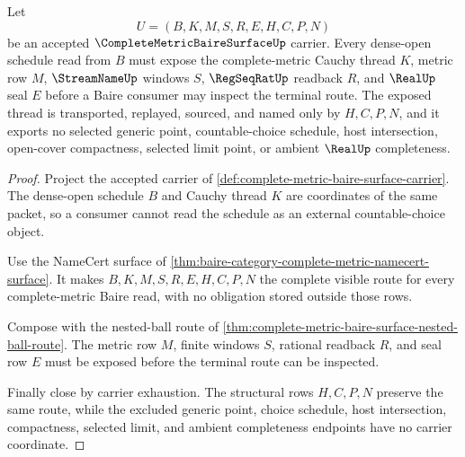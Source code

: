 \begin{theorem}
\label{thm:complete-metric-baire-surface-open-density-thread}
Let
$$
U=(B,K,M,S,R,E,H,C,P,N)
$$
be an accepted $\CompleteMetricBaireSurfaceUp$ carrier. Every dense-open schedule read from $B$ must expose the complete-metric Cauchy thread $K$, metric row $M$, $\StreamNameUp$ windows $S$, $\RegSeqRatUp$ readback $R$, and $\RealUp$ seal $E$ before a Baire consumer may inspect the terminal route. The exposed thread is transported, replayed, sourced, and named only by $H,C,P,N$, and it exports no selected generic point, countable-choice schedule, host intersection, open-cover compactness, selected limit point, or ambient $\RealUp$ completeness.
\end{theorem}
\begin{proof}
Project the accepted carrier of \autoref{def:complete-metric-baire-surface-carrier}. The dense-open schedule $B$ and Cauchy thread $K$ are coordinates of the same packet, so a consumer cannot read the schedule as an external countable-choice object.

Use the NameCert surface of \autoref{thm:baire-category-complete-metric-namecert-surface}. It makes $B,K,M,S,R,E,H,C,P,N$ the complete visible route for every complete-metric Baire read, with no obligation stored outside those rows.

Compose with the nested-ball route of \autoref{thm:complete-metric-baire-surface-nested-ball-route}. The metric row $M$, finite windows $S$, rational readback $R$, and seal row $E$ must be exposed before the terminal route can be inspected.

Finally close by carrier exhaustion. The structural rows $H,C,P,N$ preserve the same route, while the excluded generic point, choice schedule, host intersection, compactness, selected limit, and ambient completeness endpoints have no carrier coordinate.
\end{proof}


